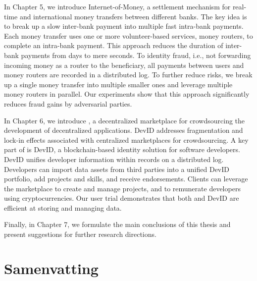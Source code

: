 In Chapter 5, we introduce Internet-of-Money, a settlement mechanism for real-time and international money transfers between different banks.
The key idea is to break up a slow inter-bank payment into multiple fast intra-bank payments.
Each money transfer uses one or more volunteer-based services, money routers, to complete an intra-bank payment.
This approach reduces the duration of inter-bank payments from days to mere seconds.
To identity fraud, i.e., not forwarding incoming money as a router to the beneficiary, all payments between users and money routers are recorded in a distributed log.
To further reduce risks, we break up a single money transfer into multiple smaller ones and leverage multiple money routers in parallel.
Our experiments show that this approach significantly reduces fraud gains by adversarial parties.

In Chapter 6, we introduce \Dappcoder{}, a decentralized marketplace for crowdsourcing the development of decentralized applications.
DevID addresses fragmentation and lock-in effects associated with centralized marketplaces for crowdsourcing.
A key part of \Dappcoder{} is DevID, a blockchain-based identity solution for software developers.
DevID unifies developer information within records on a distributed log.
Developers can import data assets from third parties into a unified DevID portfolio, add projects and skills, and receive endorsements.
Clients can leverage the \Dappcoder{} marketplace to create and manage projects, and to remunerate developers using cryptocurrencies.
Our user trial demonstrates that both \Dappcoder{} and DevID are efficient at storing and managing data.

Finally, in Chapter 7, we formulate the main conclusions of this thesis and present suggestions for further research directions.

\chapter*{Samenvatting}


